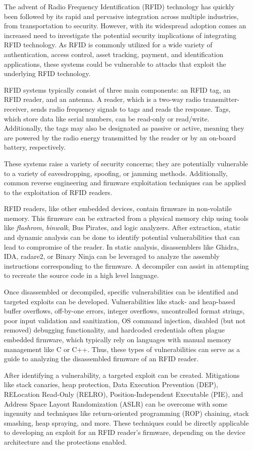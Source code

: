
The advent of Radio Frequency Identification (RFID) technology has quickly been followed by its rapid and pervasive integration across multiple industries, from transportation to security. However, with its widespread adoption comes an increased need to investigate the potential security implications of integrating RFID technology. As RFID is commonly utilized for a wide variety of authentication, access control, asset tracking, payment, and identification applications, these systems could be vulnerable to attacks that exploit the underlying RFID technology. 

RFID systems typically consist of three main components: an RFID tag, an RFID reader, and an antenna. A reader, which is a two-way radio transmitter-receiver, sends radio frequency signals to tags and reads the response. Tags, which store data like serial numbers, can be read-only or read/write. Additionally, the tags may also be designated as passive or active, meaning they are powered by the radio energy transmitted by the reader or by an on-board battery, respectively.

These systems raise a variety of security concerns; they are potentially vulnerable to a variety of eavesdropping, spoofing, or jamming methods. Additionally, common reverse engineering and firmware exploitation techniques can be applied to the exploitation of RFID readers. 

RFID readers, like other embedded devices, contain firmware in non-volatile memory. This firmware can be extracted from a physical memory chip using tools like \textit{flashrom}, \textit{binwalk}, Bus Pirates, and logic analyzers. After extraction, static and dynamic analysis can be done to identify potential vulnerabilities that can lead to compromise of the reader. In static analysis, disassemblers like Ghidra, IDA, radare2, or Binary Ninja can be leveraged to analyze the assembly instructions corresponding to the firmware. A decompiler can assist in attempting to recreate the source code in a high level language.  

Once disassembled or decompiled, specific vulnerabilities can be identified and targeted exploits can be developed. Vulnerabilities like stack- and heap-based buffer overflows, off-by-one errors, integer overflows, uncontrolled format strings, poor input validation and sanitization, OS command injection, disabled (but not removed) debugging functionality, and hardcoded credentials often plague embedded firmware, which typically rely on languages with manual memory management like C or C++. Thus, these types of vulnerabilities can serve as a guide to analyzing the disassembled firmware of an RFID reader. 

After identifying a vulnerability, a targeted exploit can be created. Mitigations like stack canaries, heap protection, Data Execution Prevention (DEP), RELocation Read-Only (RELRO), Position-Independent Executable (PIE), and Address Space Layout Randomization (ASLR) can be overcome with some ingenuity and techniques like return-oriented programming (ROP) chaining, stack smashing, heap spraying, and more. These techniques could be directly applicable to developing an exploit for an RFID reader's firmware, depending on the device architecture and the protections enabled. 